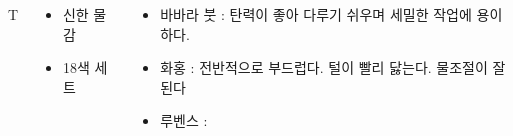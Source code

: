 \documentclass[	20pt, 
							a0paper, 
							landscape, %
							margin=0mm, %
							innermargin=4mm,  		%
							blockverticalspace=4mm, %
							colspace=5mm, 
							subcolspace=0mm
							]{tikzposter}
\begin{document}
\begin{columns}
{		}T


		{

			\begin{LARGE}
			\begin{itemize}
			\item 신한 물감
			\item 18색 세트
			\end{itemize}
			\end{LARGE}

		}

		{

			\begin{LARGE}
			\begin{itemize}
			\item 바바라 붓 : 탄력이 좋아 다루기 쉬우며 세밀한 작업에 용이하다.
			\item 화홍 : 전반적으로 부드럽다. 털이 빨리 닳는다. 물조절이 잘 된다
			\item 루벤스 : 

			\end{itemize}
			\end{LARGE}
		}



		{
			\setlength{\leftmargini}{2em}			
			\setlength{\labelsep}{1em} %

}
\end{columns}
\end{document}
